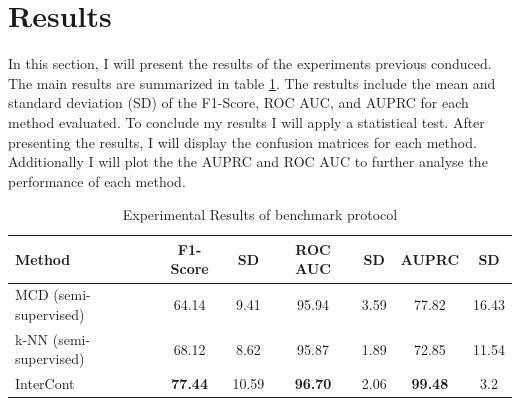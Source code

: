 \section{Results}

In this section, I will present the results of the experiments previous conduced.
The main results are summarized in table \ref{tab:results_bench}.
The restults include the mean and standard deviation (SD) of the F1-Score, ROC AUC, and AUPRC for each method evaluated. 
To conclude my results I will apply a statistical test.
After presenting the results, I will display the confusion matrices for each method.
Additionally I will plot the the AUPRC and ROC AUC to further analyse the performance of each method.







\begin{table}[h]
\centering
\caption{Experimental Results of benchmark protocol}
\label{tab:results_bench}
\begin{tabular}{lcccccc} 
\toprule
\textbf{Method}         & \textbf{F1-Score} & \textbf{SD} & \textbf{ROC AUC} & \textbf{SD} & \textbf{AUPRC} & \textbf{SD}          \\
\midrule
MCD  (semi-supervised)  & 64.14             & 9.41  &  95.94            & 3.59     & 77.82             & 16.43  \\
k-NN (semi-supervised)  & 68.12             & 8.62  &  95.87            & 1.89     & 72.85             & 11.54  \\
InterCont               & \textbf{77.44}    & 10.59 &  \textbf{96.70}   & 2.06     & \textbf{99.48}    & 3.2   \\
\bottomrule
\end{tabular}
\end{table}


